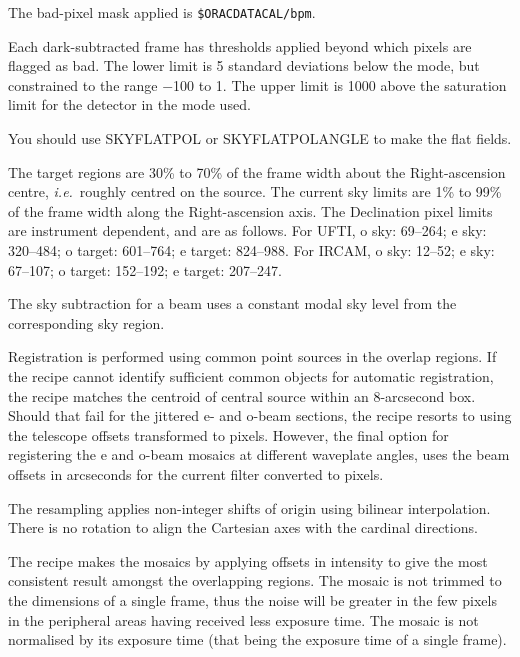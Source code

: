 \documentclass[twoside,11pt]{article}
\newcommand{\htmlref}[2]{#1}
\renewcommand{\_}{\texttt{\symbol{95}}}
\newcommand{\sstitem}{\item}
\begin{document}
{{{         \sstitem
         The bad-pixel mask applied is {\tt\$ORAC\_DATA\_CAL/bpm}.

         \sstitem
         Each dark-subtracted frame has thresholds applied beyond which
         pixels are flagged as bad.  The lower limit is 5 standard
         deviations below the mode, but constrained to the range $-$100 to 1.
         The upper limit is 1000 above the saturation limit for the detector
         in the mode used.

         \sstitem
         You should use \htmlref{SKY\_FLAT\_POL}{SKY\_FLAT\_POL} or
         \htmlref{SKY\_FLAT\_POL\_ANGLE}{SKY\_FLAT\_POL\_ANGLE} to make the
         flat fields.

         \sstitem
         The target regions are 30\% to 70\% of the frame width about
         the Right-ascension centre, {\em{i.e.}}\ roughly centred on the source.
         The current sky limits are 1\% to 99\% of the frame width along the
         Right-ascension axis.  The Declination pixel limits are instrument
         dependent, and are as follows.  For UFTI, o sky: 69--264;
         e sky: 320--484; o target: 601--764; e target: 824--988.  For
         IRCAM, o sky: 12--52; e sky: 67--107; o target: 152--192;
         e target: 207--247.

         \sstitem
         The sky subtraction for a beam uses a constant modal sky level
         from the corresponding sky region.

         \sstitem
         Registration is performed using common point sources in the
         overlap regions.  If the recipe cannot identify sufficient common
         objects for automatic registration, the recipe matches the centroid
         of central source within an 8-arcsecond box.  Should that fail for
         the jittered e- and o-beam sections, the recipe resorts to using the
         telescope offsets transformed to pixels.  However, the final option
         for registering the e and o-beam mosaics at different waveplate
         angles, uses the beam offsets in arcseconds for the current filter
         converted to pixels.

         \sstitem
         The resampling applies non-integer shifts of origin using
         bilinear interpolation.  There is no rotation to align the
         Cartesian axes with the cardinal directions.

         \sstitem
         The recipe makes the mosaics by applying offsets in intensity
         to give the most consistent result amongst the overlapping regions.
         The mosaic is not trimmed to the dimensions of a single frame, thus
         the noise will be greater in the few pixels in the peripheral areas
         having received less exposure time.  The mosaic is not normalised by
         its exposure time (that being the exposure time of a single frame).

}}}
\end{document}
